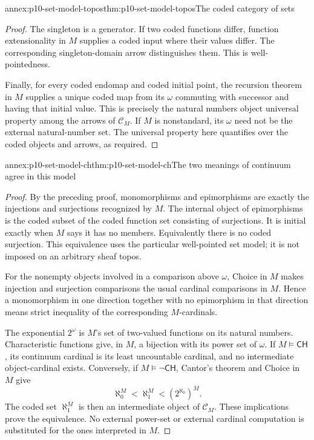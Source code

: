 \begin{annexitem}{annex:p10-set-model-topos}{thm:p10-set-model-topos}{The coded category of sets}
\begin{proof}
The singleton is a generator.
If two coded functions differ, function extensionality in \(M\)
supplies a coded input where their values differ.
The corresponding singleton-domain arrow distinguishes them.
This is well-pointedness.

Finally, for every coded endomap and coded initial point,
the recursion theorem in \(M\) supplies a unique coded map
from its \(\omega\) commuting with successor and having that
initial value. This is precisely the natural numbers object
universal property among the arrows of \(\mathcal C_M\).
If \(M\) is nonstandard, its \(\omega\) need not be the
external natural-number set. The universal property here
quantifies over the coded objects and arrows, as required.
\end{proof}
\end{annexitem}

\begin{annexitem}{annex:p10-set-model-ch}{thm:p10-set-model-ch}{The two meanings of continuum agree in this model}
\begin{proof}
By the preceding proof, monomorphisms and epimorphisms are
exactly the injections and surjections recognized by \(M\).
The internal object of epimorphisms is the coded subset of
the coded function set consisting of surjections.
It is initial exactly when \(M\) says it has no members.
Equivalently there is no coded surjection.
This equivalence uses the particular well-pointed set model;
it is not imposed on an arbitrary sheaf topos.

For the nonempty objects involved in a comparison above
\(\omega\), Choice in \(M\) makes injection and surjection
comparisons the usual cardinal comparisons in \(M\).
Hence a monomorphism in one direction together with no
epimorphism in that direction means strict inequality of
the corresponding \(M\)-cardinals.

The exponential \(2^\omega\) is \(M\)'s set of
two-valued functions on its natural numbers.
Characteristic functions give, in \(M\), a bijection with
its power set of \(\omega\).
If \(M\models\mathsf{CH}\), its continuum cardinal is
its least uncountable cardinal, and no intermediate
object-cardinal exists.
Conversely, if \(M\models\neg\mathsf{CH}\), Cantor's
theorem and Choice in \(M\) give
\[
 \aleph_0^M<\aleph_1^M<(2^{\aleph_0})^M.
\]
The coded set \(\aleph_1^M\) is then an intermediate object
of \(\mathcal C_M\).
These implications prove the equivalence.
No external power-set or external cardinal computation
is substituted for the ones interpreted in \(M\).
\end{proof}
\end{annexitem}

